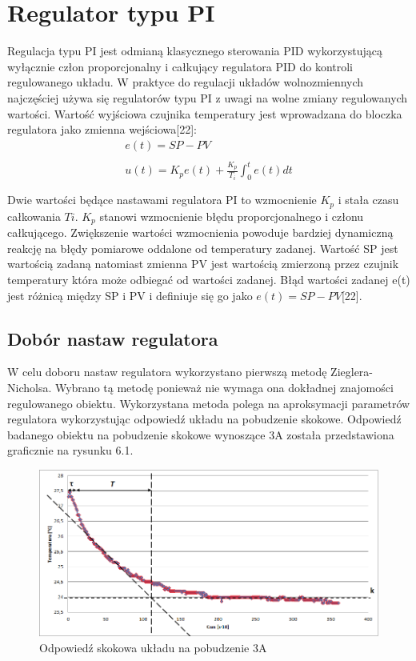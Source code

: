 \documentclass[oneside]{mgr}
\begin{document}
\section{Regulator typu PI}
Regulacja typu PI jest odmianą klasycznego sterowania PID wykorzystującą wyłącznie człon proporcjonalny i całkujący regulatora PID do kontroli regulowanego układu. W praktyce do regulacji układów wolnozmiennych najczęściej używa się regulatorów typu PI z uwagi na wolne zmiany regulowanych wartości. Wartość wyjściowa czujnika temperatury jest wprowadzana do bloczka regulatora jako zmienna wejściowa[22]:
\begin{equation*}
    \begin{array}{c}
        e(t) = SP - PV \\ \\
        u(t) = K_{p}e(t) + \frac{K_p}{T_i} \int_{0}^t e(t)dt \\ \\
    \end{array}
\end{equation*}
Dwie wartości będące nastawami regulatora PI to wzmocnienie $K_p$ i stała czasu całkowania $Ti$. $K_p$ stanowi wzmocnienie błędu proporcjonalnego i członu całkującego. Zwiększenie wartości wzmocnienia powoduje bardziej dynamiczną reakcję na błędy pomiarowe oddalone od temperatury zadanej. Wartość SP jest wartością zadaną natomiast zmienna PV jest wartością zmierzoną przez czujnik temperatury która może odbiegać od wartości zadanej. Błąd wartości zadanej e(t) jest różnicą między SP i PV i definiuje się go jako $e(t) = SP-PV$[22].
\subsection{Dobór nastaw regulatora}
W celu doboru nastaw regulatora wykorzystano pierwszą metodę Zieglera- Nicholsa. Wybrano tą metodę ponieważ nie wymaga ona dokładnej znajomości regulowanego obiektu. Wykorzystana metoda polega na aproksymacji parametrów regulatora wykorzystując odpowiedź układu na pobudzenie skokowe. Odpowiedź badanego obiektu na pobudzenie skokowe wynoszące 3A została przedstawiona graficznie na rysunku 6.1.
\begin{center}
\begin{figure}[h!]
    \centering
    \includegraphics[width=\textwidth]{Odpowiedz_skokowa_regulacja.png}
    \caption{Odpowiedź skokowa układu na pobudzenie 3A}
    \end{figure}
\end{center}
\end{document}
